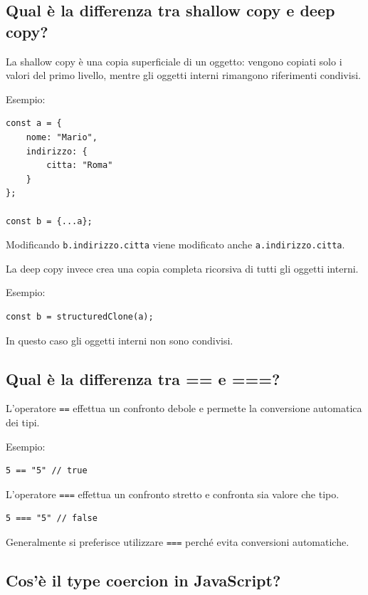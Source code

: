 \documentclass[12pt]{article}
\begin{document}
\subsection{Qual è la differenza tra shallow copy e deep copy?}

La shallow copy è una copia superficiale di un oggetto: vengono copiati solo i valori del primo livello, mentre gli oggetti interni rimangono riferimenti condivisi.

Esempio:

\begin{verbatim}
const a = {
    nome: "Mario",
    indirizzo: {
        citta: "Roma"
    }
};

const b = {...a};
\end{verbatim}

Modificando \texttt{b.indirizzo.citta} viene modificato anche \texttt{a.indirizzo.citta}.

La deep copy invece crea una copia completa ricorsiva di tutti gli oggetti interni.

Esempio:

\begin{verbatim}
const b = structuredClone(a);
\end{verbatim}

In questo caso gli oggetti interni non sono condivisi.


\subsection{Qual è la differenza tra == e ===?}

L'operatore \texttt{==} effettua un confronto debole e permette la conversione automatica dei tipi.

Esempio:

\begin{verbatim}
5 == "5" // true
\end{verbatim}

L'operatore \texttt{===} effettua un confronto stretto e confronta sia valore che tipo.

\begin{verbatim}
5 === "5" // false
\end{verbatim}

Generalmente si preferisce utilizzare \texttt{===} perché evita conversioni automatiche.


\subsection{Cos'è il type coercion in JavaScript?}
\end{document}

